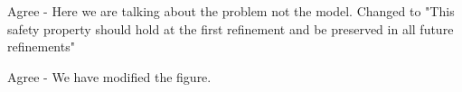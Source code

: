 \documentclass{response}
\begin{document}
\begin{comment}{Reviewer \#3}
  * Line -9: "on an Idle state" -> "in an Idle state".
\end{comment}

\begin{response}
\end{response}

\begin{comment}{Reviewer \#3}
* Line -6: "while SPI subsystem ..." -> "while the SPI subsystem ..."
\end{comment}

\begin{response}
\end{response}

\begin{comment}{Reviewer \#3}
  Page 6:

  * Figure 2: this looks like a way of modeling event refinement,
  which seems different from state refinement. Perhaps comment on
  this.
\end{comment}

\begin{response}
\end{response}

\begin{comment}{Reviewer \#3}
  * Line -7: "This safety property is introduced ..." : where, when?
\end{comment}

\begin{response}
	Agree - Here we are talking about the problem not the model. Changed to "This safety property should hold at the first refinement and be preserved in all future refinements"
\end{response}

\begin{comment}{Reviewer \#3}
* Figure 2(b): "last_byte_send" -> "last_byte_sent".
\end{comment}

\begin{response}
  Agree - We have modified the figure.
\end{response}

\begin{comment}{Reviewer \#3}
  Page 7:

  * Mid: "Ancillary data, with corresponding actions to alter it, can
  ..." - something is wrong with this sentence.
\end{comment}
\end{document}
